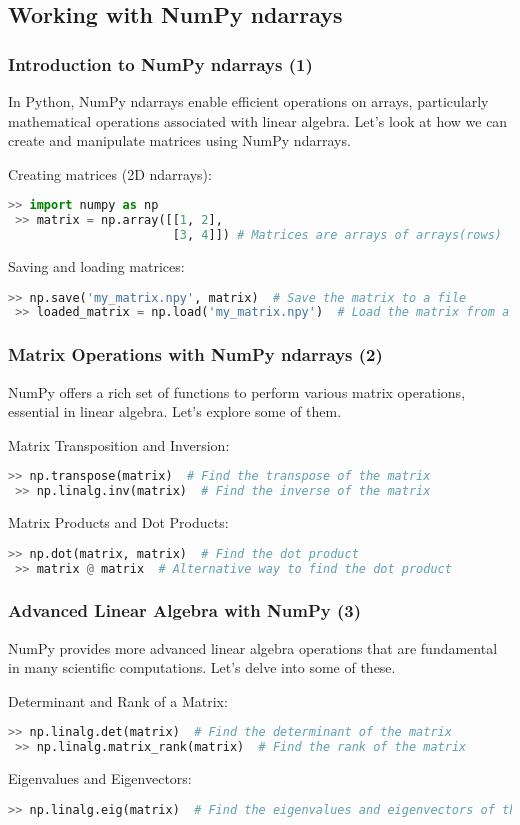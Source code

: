 \subsection*{Working with NumPy ndarrays}
\begin{frame}[fragile]
  \frametitle{Introduction to NumPy ndarrays (1)}
  In Python, NumPy ndarrays enable efficient operations on arrays, particularly mathematical operations associated with linear algebra. Let's look at how we can create and manipulate matrices using NumPy ndarrays.\pause
  
  Creating matrices (2D ndarrays):
  \begin{lstlisting}[language=Python]
 >> import numpy as np
 >> matrix = np.array([[1, 2], 
                       [3, 4]]) # Matrices are arrays of arrays(rows)
  \end{lstlisting}\pause

  Saving and loading matrices:
  \begin{lstlisting}[language=Python]
 >> np.save('my_matrix.npy', matrix)  # Save the matrix to a file
 >> loaded_matrix = np.load('my_matrix.npy')  # Load the matrix from a file
  \end{lstlisting}
\end{frame}

\begin{frame}[fragile]
  \frametitle{Matrix Operations with NumPy ndarrays (2)}
  NumPy offers a rich set of functions to perform various matrix operations, essential in linear algebra. Let's explore some of them.\pause

  Matrix Transposition and Inversion:
  \begin{lstlisting}[language=Python]
 >> np.transpose(matrix)  # Find the transpose of the matrix
 >> np.linalg.inv(matrix)  # Find the inverse of the matrix
  \end{lstlisting}\pause

  Matrix Products and Dot Products:
  \begin{lstlisting}[language=Python]
 >> np.dot(matrix, matrix)  # Find the dot product
 >> matrix @ matrix  # Alternative way to find the dot product
  \end{lstlisting}
\end{frame}

\begin{frame}[fragile]
  \frametitle{Advanced Linear Algebra with NumPy (3)}
  NumPy provides more advanced linear algebra operations that are fundamental in many scientific computations. Let’s delve into some of these.\pause
  
  Determinant and Rank of a Matrix:
  \begin{lstlisting}[language=Python]
 >> np.linalg.det(matrix)  # Find the determinant of the matrix
 >> np.linalg.matrix_rank(matrix)  # Find the rank of the matrix
  \end{lstlisting}\pause
  
  Eigenvalues and Eigenvectors:
  \begin{lstlisting}[language=Python]
 >> np.linalg.eig(matrix)  # Find the eigenvalues and eigenvectors of the matrix
  \end{lstlisting}
\end{frame}


